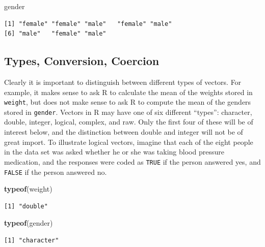 \documentclass[
]{krantz}
\makeatletter
\newenvironment{Shaded}{\begin{snugshade}}{\end{snugshade}}
\newcommand{\KeywordTok}[1]{\textcolor[rgb]{0.27,0.27,0.27}{\textbf{#1}}}
\newcommand{\NormalTok}[1]{#1}
\newenvironment{kframe}{%
\medskip{}
\setlength{\fboxsep}{.8em}
 \def\at@end@of@kframe{}%
 \ifinner\ifhmode%
  \def\at@end@of@kframe{\end{minipage}}%
  \begin{minipage}{\columnwidth}%
 \fi\fi%
 \def\FrameCommand##1{\hskip\@totalleftmargin \hskip-\fboxsep
 \colorbox{shadecolor}{##1}\hskip-\fboxsep
     \hskip-\linewidth \hskip-\@totalleftmargin \hskip\columnwidth}%
 \MakeFramed {\advance\hsize-\width
   \@totalleftmargin\z@ \linewidth\hsize
   \@setminipage}}%
 {\par\unskip\endMakeFramed%
 \at@end@of@kframe}
\renewenvironment{Shaded}{\begin{kframe}}{\end{kframe}}
\makeatother
\begin{document}
\begin{Shaded}
\begin{Highlighting}[]
\NormalTok{gender}
\end{Highlighting}
\end{Shaded}

\begin{verbatim}
[1] "female" "female" "male"   "female" "male"  
[6] "male"   "female" "male"  
\end{verbatim}

\hypertarget{types-conversion-coercion}{%
\subsection{Types, Conversion, Coercion}\label{types-conversion-coercion}}

Clearly it is important to distinguish between different types of vectors. For example, it makes sense to ask R to calculate the mean of the weights stored in \texttt{weight}, but does not make sense to ask R to compute the mean of the genders stored in \texttt{gender}. Vectors in R may have one of six different ``types'': character, double, integer, logical, complex, and raw. Only the first four of these will be of interest below, and the distinction between double and integer will not be of great import. To illustrate logical vectors, imagine that each of the eight people in the data set was asked whether he or she was taking blood pressure medication, and the responses were coded as \texttt{TRUE} if the person answered yes, and \texttt{FALSE} if the person answered no.

\begin{Shaded}
\begin{Highlighting}[]
\KeywordTok{typeof}\NormalTok{(weight)}
\end{Highlighting}
\end{Shaded}

\begin{verbatim}
[1] "double"
\end{verbatim}

\begin{Shaded}
\begin{Highlighting}[]
\KeywordTok{typeof}\NormalTok{(gender)}
\end{Highlighting}
\end{Shaded}

\begin{verbatim}
[1] "character"
\end{verbatim}
\end{document}
